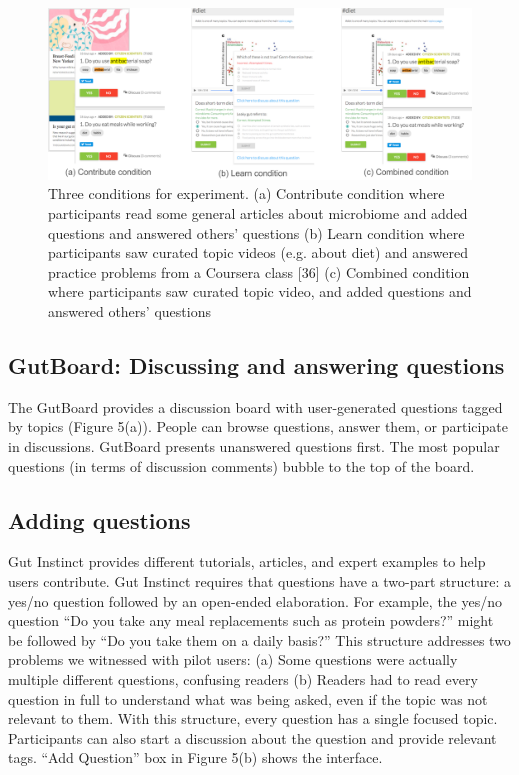 \begin{figure}[h] 
  \centering
  \includegraphics[width=1.0\textwidth]{figures/gutinstinct/gi-6.png}
  \caption[]
{Three conditions for experiment. (a) Contribute condition where participants read some general articles about microbiome and added questions and answered others’ questions (b) Learn condition where participants saw curated topic videos (e.g. about diet) and answered practice problems from a Coursera class [36] (c) Combined condition where participants saw curated topic video, and added questions and answered others’ questions }
  \label{fig:gi-6}
\end{figure}


\subsection{GutBoard: Discussing and answering questions}
The GutBoard provides a discussion board with user-generated questions tagged by topics (Figure 5(a)). People can browse questions, answer them, or participate in discussions. GutBoard presents unanswered questions first. The most popular questions (in terms of discussion comments) bubble to the top of the board.
 
\subsection{Adding questions}
Gut Instinct provides different tutorials, articles, and expert examples to help users contribute. Gut Instinct requires that questions have a two-part structure: a yes/no question followed by an open-ended elaboration. For example, the yes/no question “Do you take any meal replacements such as protein powders?” might be followed by “Do you take them on a daily basis?” This structure addresses two problems we witnessed with pilot users: (a) Some questions were actually multiple different questions, confusing readers (b) Readers had to read every question in full to understand what was being asked, even if the topic was not relevant to them. With this structure, every question has a single focused topic. Participants can also start a discussion about the question and provide relevant tags. “Add Question” box in Figure 5(b) shows the interface. 


